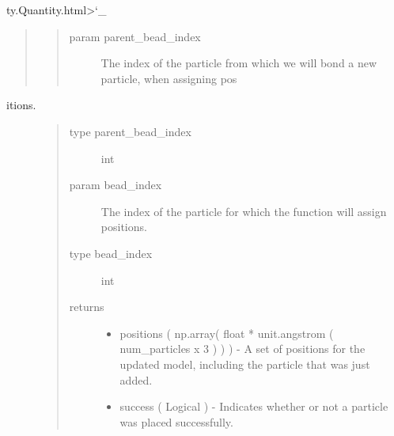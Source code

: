 \documentclass[letterpaper,12pt,english,openany,oneside]{sphinxmanual}
\begin{document}
\begin{fulllineitems}
ty.Quantity.html\textgreater{}{}`\_
\begin{quote}
\begin{quote}\begin{description}
\item[{param parent\_bead\_index}] \leavevmode
The index of the particle from which we will bond a new particle, when assigning pos

\end{description}\end{quote}
\end{quote}
\begin{description}
\item[{itions.}] \leavevmode\begin{quote}\begin{description}
\item[{type parent\_bead\_index}] \leavevmode
int

\item[{param bead\_index}] \leavevmode
The index of the particle for which the function will assign positions.

\item[{type bead\_index}] \leavevmode
int

\item[{returns}] \leavevmode\begin{itemize}
\item {} 
positions ( np.array( float * unit.angstrom ( num\_particles x 3 ) ) ) - A set of positions for the updated model, including the particle that was just added.

\item {} 
success ( Logical ) - Indicates whether or not a particle was placed successfully.

\end{itemize}

\end{description}\end{quote}

\end{description}

\end{fulllineitems}

\end{document}
